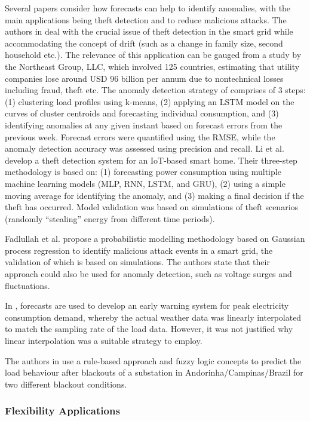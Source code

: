 Several papers consider how forecasts can help to identify anomalies, with the main applications being theft detection and to reduce malicious attacks. The authors in \cite{Fenza2019dma} deal with the crucial issue of theft detection in the smart grid while accommodating the concept of drift (such as a change in family size, second household etc.). The relevance of this application can be gauged from a study by the Northeast Group, LLC, which involved 125 countries, estimating that utility companies lose around USD 96 billion per annum due to nontechnical losses including fraud, theft etc. The anomaly detection strategy of \cite{Fenza2019dma} comprises of 3 steps: (1) clustering load profiles using k-means, (2) applying an LSTM model on the curves of cluster centroids and forecasting individual consumption, and (3) identifying anomalies at any given instant based on forecast errors from the previous week. Forecast errors were quantified using the RMSE, while the anomaly detection accuracy was assessed using precision and recall. Li et al. \cite{Li2019ans} develop a theft detection system for an IoT-based smart home. Their three-step methodology is based on: (1) forecasting power consumption using multiple machine learning models (MLP, RNN, LSTM, and GRU), (2) using a simple moving average for identifying the anomaly, and (3) making a final decision if the theft has occurred. Model validation was based on simulations of theft scenarios (randomly ``stealing'' energy from different time periods).

Fadlullah et al. \cite{Fadlullah2011aew} propose a probabilistic modelling methodology based on Gaussian process regression to identify malicious attack events in a smart grid, the validation of which is based on simulations. The authors state that their approach could also be used for anomaly detection, such as voltage surges and fluctuations.

In \cite{Komatsu2020pda}, forecasts are used to develop an early warning system for peak electricity consumption demand, whereby the actual weather data was linearly interpolated to match the sampling rate of the load data. However, it was not justified why linear interpolation was a suitable strategy to employ. 

The authors in \cite{mota2007lbp} use a rule-based approach and fuzzy logic concepts to predict the load behaviour after blackouts of a substation in Andorinha/Campinas/Brazil for two different blackout conditions.

\subsubsection{Flexibility Applications}

